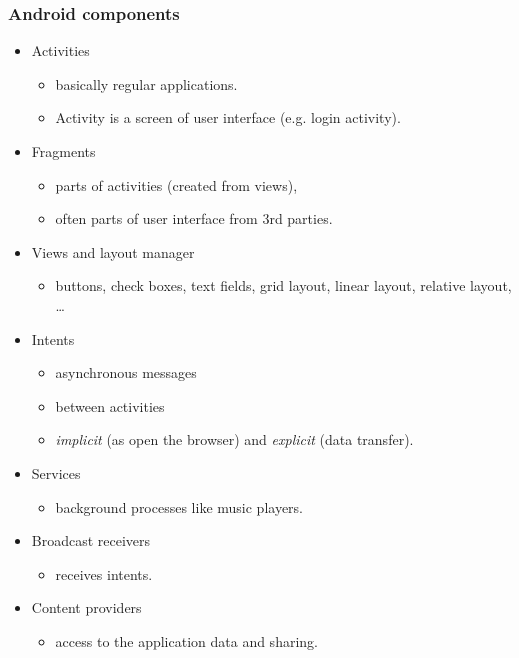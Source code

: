 \documentclass[10pt,xcolor=pdflatex]{beamer}
\begin{document}
\begin{frame}\frametitle{Android components}
	\begin{itemize}
		\item Activities
          \begin{itemize}
        	\item basically regular applications.
            \item Activity is a screen of user interface (e.g. login activity).
          \end{itemize}
		\item Fragments
          \begin{itemize}
        	\item parts of activities (created from views),
            \item often parts of user interface from 3rd parties.
          \end{itemize}
		\item Views and layout manager
          \begin{itemize}
        	\item buttons, check boxes, text fields, grid layout, linear layout, relative layout, \ldots
          \end{itemize}
 		\item Intents
          \begin{itemize}
        	\item asynchronous messages
            \item between activities
            \item \emph{implicit} (as open the browser) and \emph{explicit} (data transfer).
          \end{itemize}
		\item Services
          \begin{itemize}
        	\item background processes like music players.
          \end{itemize}
		\item Broadcast receivers
          \begin{itemize}
            \item receives intents.
          \end{itemize}
		\item Content providers
          \begin{itemize}
            \item access to the application data and sharing.
          \end{itemize}
	\end{itemize}
\end{frame}
\end{document}
